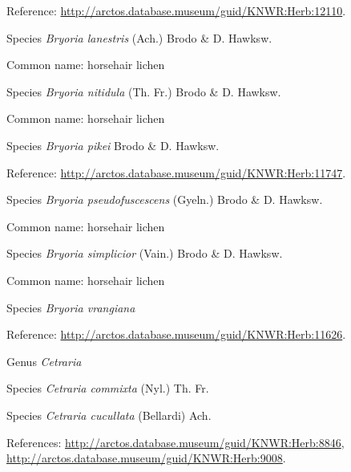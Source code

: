 \documentclass[9pt, article]{memoir}
\begin{document}
\begin{multicols}{2}
Reference: 
\url{http://arctos.database.museum/guid/KNWR:Herb:12110}.

\vspace{6pt}\noindent\hspace{36pt}Species \textit{Bryoria lanestris} (Ach.) Brodo \& D. Hawksw.


Common name: horsehair lichen

\vspace{6pt}\noindent\hspace{36pt}Species \textit{Bryoria nitidula} (Th. Fr.) Brodo \& D. Hawksw.


Common name: horsehair lichen

\vspace{6pt}\noindent\hspace{36pt}Species \textit{Bryoria pikei} Brodo \& D. Hawksw.


Reference: 
\url{http://arctos.database.museum/guid/KNWR:Herb:11747}.

\vspace{6pt}\noindent\hspace{36pt}Species \textit{Bryoria pseudofuscescens} (Gyeln.) Brodo \& D. Hawksw.


Common name: horsehair lichen

\vspace{6pt}\noindent\hspace{36pt}Species \textit{Bryoria simplicior} (Vain.) Brodo \& D. Hawksw.


Common name: horsehair lichen

\vspace{6pt}\noindent\hspace{36pt}Species \textit{Bryoria vrangiana}


Reference: 
\url{http://arctos.database.museum/guid/KNWR:Herb:11626}.

\vspace{6pt}\noindent\hspace{30pt}Genus \textit{Cetraria}


\vspace{6pt}\noindent\hspace{36pt}Species \textit{Cetraria commixta} (Nyl.) Th. Fr.


\vspace{6pt}\noindent\hspace{36pt}Species \textit{Cetraria cucullata} (Bellardi) Ach.


References: 
\url{http://arctos.database.museum/guid/KNWR:Herb:8846}, 
\url{http://arctos.database.museum/guid/KNWR:Herb:9008}.


\end{multicols}
\end{document}
